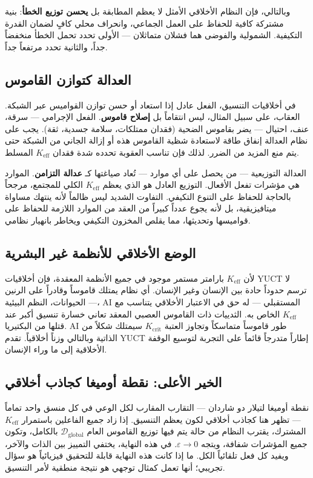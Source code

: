 \documentclass[12pt,a4paper]{article}
\newcommand{\Keff}{K_{\mathrm{eff}}}
\begin{document}
	وبالتالي، فإن النظام الأخلاقي الأمثل لا يعظم المطابقة بل \textbf{يحسن توزيع الخطأ}: بنية مشتركة كافية للحفاظ على العمل الجماعي، وانحراف محلي كافٍ لضمان القدرة التكيفية. الشمولية والفوضى هما فشلان متماثلان — الأولى تحدد تحمل الخطأ منخفضاً جداً، والثانية تحدد مرتفعاً جداً.
	
	\subsection{العدالة كتوازن القاموس}
	
	في أخلاقيات التنسيق، الفعل عادل إذا استعاد أو حسن توازن القواميس عبر الشبكة. العقاب، على سبيل المثال، ليس انتقاماً بل \textbf{إصلاح قاموس}. الفعل الإجرامي — سرقة، عنف، احتيال — يضر بقاموس الضحية (فقدان ممتلكات، سلامة جسدية، ثقة). يجب على نظام العدالة إنفاق طاقة لاستعادة شظية القاموس هذه أو إزالة الجاني من الشبكة حتى يتم منع المزيد من الضرر. لذلك فإن تناسب العقوبة تحدده شدة فقدان \(K_{\mathrm{eff}}\) المسلط.
	
	العدالة التوزيعية — من يحصل على أي موارد — تُعاد صياغتها كـ \textbf{عدالة التزامن}. الموارد هي مؤشرات تفعل الأفعال. التوزيع العادل هو الذي يعظم \(K_{\mathrm{eff}}\) الكلي للمجتمع، مرجحاً بالحاجة للحفاظ على التنوع التكيفي. التفاوت الشديد ليس ظالماً لأنه ينتهك مساواة ميتافيزيقية، بل لأنه يجوع عدداً كبيراً من العقد من الموارد اللازمة للحفاظ على قواميسها وتحديثها، مما يقلص المخزون التكيفي ويخاطر بانهيار نظامي.
	
	\subsection{الوضع الأخلاقي للأنظمة غير البشرية}
	
	لأن \(\Keff\) بارامتر مستمر موجود في جميع الأنظمة المعقدة، فإن أخلاقيات YUCT لا ترسم حدوداً حادة بين الإنسان وغير الإنسان. أي نظام يمتلك قاموساً وقادراً على الرنين — الحيوانات، النظم البيئية، AI المستقبلي — له حق في الاعتبار الأخلاقي يتناسب مع \(\Keff\) الخاص به. الثدييات ذات القاموس العصبي المعقد تعاني خسارة تنسيق أكبر عند قتلها من البكتيريا. AI طور قاموساً متماسكاً وتجاوز العتبة \(K_{\mathrm{crit}}\) سيمتلك شكلاً من الذاتية وبالتالي وزناً أخلاقياً. تقدم YUCT إطاراً متدرجاً قائماً على التجربة لتوسيع الوقفة الأخلاقية إلى ما وراء الإنسان.
	
	\subsection{الخير الأعلى: نقطة أوميغا كجاذب أخلاقي}
	
	نقطة أوميغا لتيلار دو شاردان — التقارب المقارب لكل الوعي في كل منسق واحد تماماً — تظهر هنا كجاذب أخلاقي لكون يعظم التنسيق. إذا زاد جميع الفاعلين باستمرار \(\Keff\) المشترك، يقترب النظام من حالة يتم فيها توزيع القاموس العام \(\mathcal{D}_{\text{global}}\) بالكامل، وتكون جميع المؤشرات شفافة، ويتجه \(\varepsilon \to 0\). في هذه النهاية، يختفي التمييز بين الذات والآخر، ويفيد كل فعل تلقائياً الكل. ما إذا كانت هذه النهاية قابلة للتحقيق فيزيائياً هو سؤال تجريبي؛ أنها تعمل كمثال توجهي هو نتيجة منطقية لأمر التنسيق.
	
\end{document}
